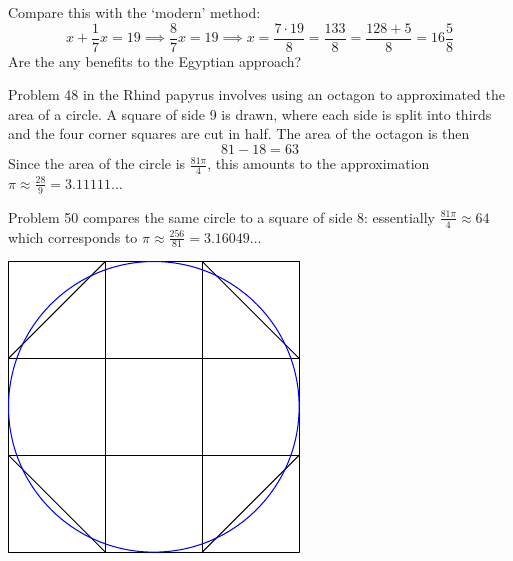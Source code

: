 Compare this with the `modern' method:
\[
	x+\frac 17x=19\implies \frac 87x=19\implies x=\frac{7\cdot 19}8 =\frac{133}8 =\frac{128+5}8= 16\frac 58
\]
Are the any benefits to the Egyptian approach?

\begin{minipage}[t]{0.67\linewidth}\vspace{0pt}
	
	Problem 48 in the Rhind papyrus involves using an octagon to approximated the area of a circle. A square of side 9 is drawn, where each side is split into thirds and the four corner squares are cut in half. The area of the octagon is then \[81-18=63\]
	Since the area of the circle is $\frac{81\pi}4$, this amounts to the approximation $\pi\approx\frac{28}9=3.11111\ldots$\smallbreak
	
	Problem 50 compares the same circle to a square of side 8: essentially $\frac{81\pi}4\approx 64$ which corresponds to $\pi\approx \frac{256}{81}=3.16049\ldots$
\end{minipage}
\hfill
\begin{minipage}[t]{0.32\linewidth}\vspace{0pt}
	\flushright\includegraphics{egypt-octagon}
\end{minipage}\medbreak


